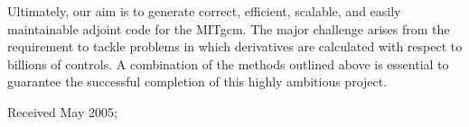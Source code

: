 \documentclass[acmtocl,acmnow]{acmtrans2m}
\begin{document}
Ultimately, our aim is to generate correct, efficient, scalable, and easily 
maintainable adjoint code for the MITgcm. The major challenge arises from the
requirement to tackle problems in which derivatives are calculated with respect 
to billions of controls. A combination of the methods outlined above is 
essential to guarantee the successful completion of this highly ambitious
project.





\begin{received}
Received May 2005;
\end{received}
\end{document}
